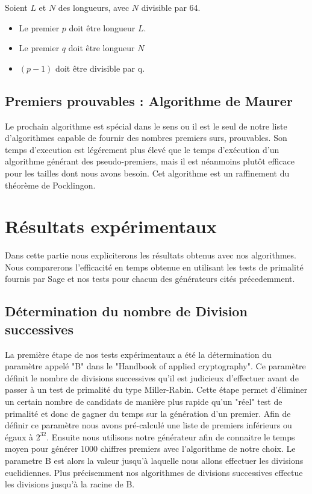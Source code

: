\documentclass[a4paper,11pt]{article}
\begin{document}
Soient $L$ et $N$ des longueurs, avec $N$ divisible par 64.
\medbreak
\begin{itemize}
\item Le premier $p$ doit être longueur $L$.  
\item Le premier $q$ doit être longueur $N$
\item $(p-1)$ doit être divisible par q.
\end{itemize}


\subsection{Premiers prouvables : Algorithme de Maurer}

Le prochain algorithme est spécial dans le sens ou il est le seul de notre liste d'algorithmes capable de fournir des nombres premiers surs, prouvables. Son temps d'execution est légérement plus élevé que le temps d'exécution d'un algorithme générant des pseudo-premiers, mais il est néanmoins plutôt efficace pour les tailles dont nous avons besoin. Cet algorithme est un raffinement du théorème de Pocklingon.


\section{Résultats expérimentaux}
Dans cette partie nous expliciterons les résultats obtenus avec nos algorithmes. Nous comparerons l'efficacité en temps obtenue en utilisant les tests de primalité fournis par Sage et nos tests pour chacun des générateurs cités précedemment.

\subsection{Détermination du nombre de Division successives}
La première étape de nos tests expérimentaux a été la détermination du paramètre appelé "B" dans le "Handbook of applied cryptography". Ce paramètre définit le nombre de divisions successives qu'il est judicieux d'effectuer avant de passer à un test de primalité du type Miller-Rabin. Cette étape permet d'éliminer un certain nombre de candidats de manière plus rapide qu'un "réel" test de primalité et donc de gagner du temps sur la génération d'un premier. 
\newline
Afin de définir ce paramètre nous avons pré-calculé une liste de premiers inférieurs ou égaux à $2^{32}$. Ensuite nous utilisons notre générateur afin de connaitre le temps moyen pour générer 1000 chiffres premiers avec l'algorithme de notre choix. Le parametre B est alors la valeur jusqu'à laquelle nous allons effectuer les divisions euclidiennes.
Plus précisemment nos algorithmes de divisions successives effectue les divisions jusqu'à la racine de B. 
\end{document}
